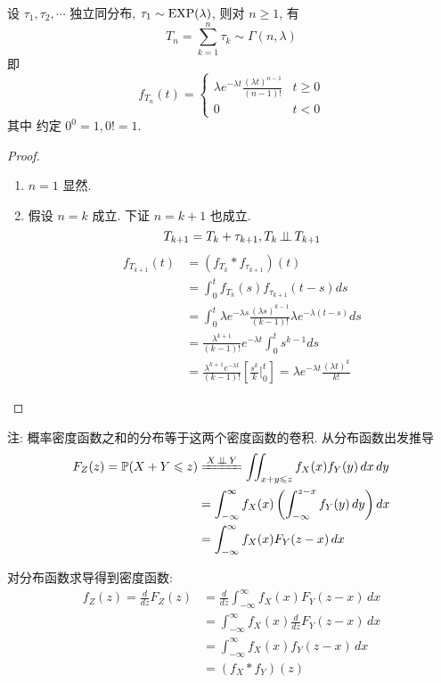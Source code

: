 \begin{theorem}[指数分布随机变量之和]
    设 $\tau_1,\tau_2,\cdots$ 独立同分布, $\tau_1\sim\operatorname{EXP}(\lambda)$, 则对 $n\geq 1$, 有
    \begin{equation}
        T_n=\sum_{k=1}^n\tau_k\sim \Gamma (n,\lambda)
    \end{equation}
    即
    \begin{equation}
        f_{T_n}(t)=\begin{cases}
            \lambda e^{-\lambda t}\frac{(\lambda t)^{n-1}}{(n-1)!} & t\geq 0\\
            0 & t<0
        \end{cases}
    \end{equation}
    其中 约定 $0^0=1, 0!=1$.
\end{theorem}

\begin{proof}
\begin{enumerate}
    \item $n=1$ 显然.
    \item 假设 $n=k$ 成立. 下证 $n=k+1$ 也成立.
    \[
    T_{k+1}=T_k+\tau_{k+1}, T_k\operatorname{\perp\!\!\!\perp} T_{k+1}
    \]
    \[
    \begin{aligned}
        f_{T_{k+1}}(t)&=(f_{T_k}*f_{\tau_{k+1}})(t)\\
        &=\int_0^t f_{T_k}(s)f_{\tau_{k+1}}(t-s)ds\\
        &=\int_0^t \lambda e^{-\lambda s}\frac{(\lambda s)^{k-1}}{(k-1)!}\lambda e^{-\lambda (t-s)}ds\\
        &=\frac{\lambda^{k+1}}{(k-1)!}e^{-\lambda t}\int_0^t s^{k-1}ds\\
        &=\frac{\lambda^{k+1}e^{-\lambda t}}{(k-1)!}\left[\frac{s^k}{k}\bigg|^t_0\right]=\lambda e^{-\lambda t}\frac{(\lambda t)^k}{k!}
    \end{aligned}
    \]
\end{enumerate}
\end{proof}

注: 概率密度函数之和的分布等于这两个密度函数的卷积. 从分布函数出发推导
\[
\begin{aligned}
F_Z(z) = \mathbb{P}(X + Y \leq z)&\xlongequal{X\ind Y} \iint_{x + y \leq z} f_X(x) f_Y(y) \, dx\,dy \\
&= \int_{-\infty}^\infty f_X(x) \left( \int_{-\infty}^{z - x} f_Y(y) \, dy \right) dx \\
&= \int_{-\infty}^\infty f_X(x) F_Y(z - x) \, dx
\end{aligned}
\]

对分布函数求导得到密度函数:
\[
\begin{aligned}
f_Z(z) = \frac{d}{dz} F_Z(z) &= \frac{d}{dz} \int_{-\infty}^\infty f_X(x) F_Y(z - x) \, dx \\
&= \int_{-\infty}^\infty f_X(x) \frac{d}{dz} F_Y(z - x) \, dx \\
&= \int_{-\infty}^\infty f_X(x) f_Y(z - x) \, dx \\
&= (f_X * f_Y)(z)
\end{aligned}
\]


